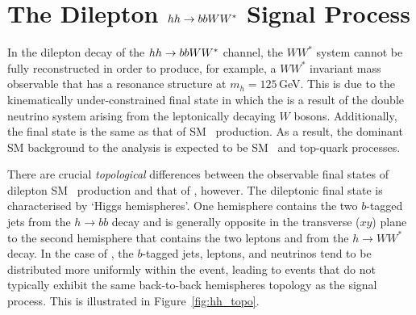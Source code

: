 \section{The Dilepton $hh \rightarrow bbWW^*$ Signal Process}
\label{sec:hh_pheno}

{\color{red}{MENTION SCALAR WW DECAY AND WW SPIN CORRELATION THAT ONLY THE DILEPTON CHANNEL CAN TAKE ADVANTAGE OF}}

In the dilepton decay of the $hh \rightarrow bbWW^*$ channel, the $WW^*$ system
cannot be fully reconstructed in order to produce, for example, a $WW^*$ invariant
mass observable that has a resonance structure at $m_h = 125$\,GeV.
This is due to the
kinematically under-constrained final state in which the \met is a result of the double neutrino system
arising from the leptonically decaying $W$ bosons.
Additionally, the final state is the same as that of SM \ttbar~production.
As a result, the dominant SM background to the analysis is expected to be SM \ttbar~and top-quark processes.

There are crucial \textit{topological} differences between the observable final states of dilepton SM \ttbar~production and
that of \bbww, however.
The dileptonic \bbww final state is characterised by `Higgs hemispheres'.
One hemisphere contains the two $b$-tagged jets from the $h \rightarrow bb$ decay and is generally
opposite in the transverse ($xy$) plane to the second hemisphere that contains the two leptons
and \met from the $h \rightarrow WW^*$ decay.
In the case of \ttbar, the $b$-tagged jets, leptons, and neutrinos tend to be distributed more uniformly
within the event, leading to events that do not typically exhibit the same back-to-back hemispheres
topology as the \bbww signal process.
This is illustrated in Figure~\ref{fig:hh_topo}.

